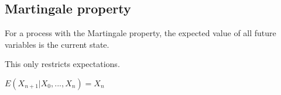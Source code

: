 
\subsection{Martingale property}

For a process with the Martingale property, the expected value of all future variables is the current state.

This only restricts expectations.

\(E(X_{n+1}|X_0,...,X_n)=X_n\)

